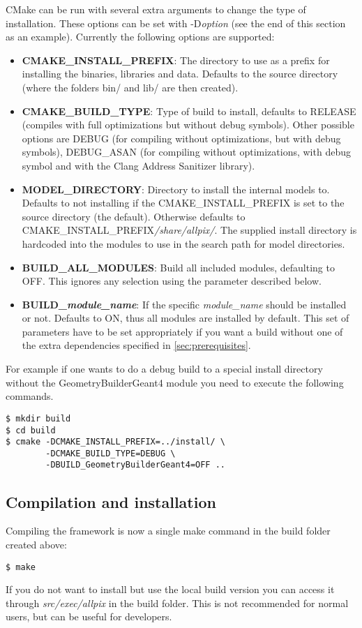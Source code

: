 CMake can be run with several extra arguments to change the type of installation. These options can be set with -D\textit{option} (see the end of this section as an example). Currently the following options are supported:
\begin{itemize}
\item \textbf{CMAKE\_INSTALL\_PREFIX}: The directory to use as a prefix for installing the binaries, libraries and data. Defaults to the source directory (where the folders bin/ and lib/ are then created). 
\item \textbf{CMAKE\_BUILD\_TYPE}: Type of build to install, defaults to RELEASE (compiles with full optimizations but without debug symbols). Other possible options are DEBUG (for compiling without optimizations, but with debug symbols), DEBUG\_ASAN (for compiling without optimizations, with debug symbol and with the Clang Address Sanitizer library). 
\item \textbf{MODEL\_DIRECTORY}: Directory to install the internal models to. Defaults to not installing if the CMAKE\_INSTALL\_PREFIX is set to the source directory (the default). Otherwise defaults to CMAKE\_INSTALL\_PREFIX\textit{/share/allpix/}. The supplied install directory is hardcoded into the modules to use in the search path for model directories.
\item \textbf{BUILD\_ALL\_MODULES}: Build all included modules, defaulting to OFF. This ignores any selection using the parameter described below.
\item \textbf{BUILD\_\textit{module\_name}}: If the specific \textit{module\_name} should be installed or not. Defaults to ON, thus all modules are installed by default. This set of parameters have to be set appropriately if you want a build without one of the extra dependencies specified in \ref{sec:prerequisites}.
\end{itemize}

For example if one wants to do a debug build to a special install directory without the GeometryBuilderGeant4 module you need to execute the following commands.
\begin{verbatim}
$ mkdir build
$ cd build
$ cmake -DCMAKE_INSTALL_PREFIX=../install/ \
        -DCMAKE_BUILD_TYPE=DEBUG \
        -DBUILD_GeometryBuilderGeant4=OFF ..
\end{verbatim}

\subsection{Compilation and installation}
Compiling the framework is now a single make command in the build folder created above:
\begin{verbatim}
$ make
\end{verbatim}
If you do not want to install but use the local build version you can access it through \textit{src/exec/allpix} in the build folder. This is not recommended for normal users, but can be useful for developers.

